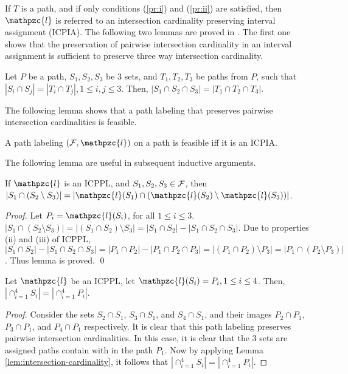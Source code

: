 \documentclass[envcountsect, envcountsame, 11pt]{../lib/llncs2e/llncs}
\def\cF{{\cal F}}
\def\cl{\mathpzc{l}}
\begin{document}
\noindent
If $T$ is a path, and if only conditions (\ref{pr:i}) and (\ref{pr:ii}) are satisfied, then $\cl$ is referred to  an intersection cardinality preserving interval assignment (ICPIA).  
The following two lemmas are proved in \cite{nsnrs09}.  The first one shows that the preservation of pairwise intersection cardinality in an interval assignment is
sufficient to preserve three way intersection cardinality.
\begin{lemma} \label{lem:intersection-cardinality}
Let $P$ be a path, $S_1, S_2, S_3$ be 3 sets, and $T_1, T_2, T_3$ be paths from $P$, such that $|S_i \cap S_j |=|T_i \cap T_j|, 1 \leq i,j \leq 3$. 
Then, $|S_1 \cap S_2 \cap S_3| = |T_1 \cap T_2 \cap T_3|$.  
\end{lemma}
The following lemma shows that  a path labeling that preserves pairwise intersection cardinalities is feasible.  
\begin{lemma} \label{lem:icpia}
  A path labeling $(\cF, \cl)$ on a path is feasible iff it is an
  ICPIA.
\end{lemma}
The following lemma are useful in subsequent inductive arguments. 
\begin{lemma}
  \label{lem:setminuscard}
  If $\cl$ is an ICPPL, and $S_1, S_2, S_3 \in \cF$, then $|S_1 \cap
  (S_2 \setminus S_3)| = |\cl(S_1) \cap (\cl(S_2) \setminus
  \cl(S_3))|$.
\end{lemma}
\begin{proof}%
  Let $P_i = \cl(S_i)$, for all $1 \le i \le  3$.
  $|S_1 \cap (S_2 \setminus S_3)| = |(S_1 \cap S_2) \setminus S_3| =
  |S_1 \cap S_2| - |S_1 \cap S_2 \cap S_3|$. Due to properties (ii)
  and (iii) of ICPPL, $|S_1 \cap S_2| - |S_1 \cap S_2 \cap S_3| = |P_1
  \cap P_2| - |P_1 \cap P_2 \cap P_3| = |(P_1 \cap P_2) \setminus P_3|
  = |P_1 \cap (P_2 \setminus P_3)|$. Thus lemma is proved. \qed
\end{proof}
\begin{lemma}
\label{lem:4-way}
Let $\cl$ be an ICPPL, let $\cl(S_i)=P_i, 1 \leq i \leq 4$.   Then, $\displaystyle |\cap_{i=1}^4 S_i| =| \cap_{i=1}^4 P_i|$.
\end{lemma}
\begin{proof}
Consider the sets $S_2 \cap S_1$, $S_3 \cap S_1$, and $S_4 \cap S_1$, and their  images $P_2 \cap P_1$, $P_3 \cap P_1$, and $P_4 \cap P_1$ respectively.  It is clear that this path labeling preserves pairwise intersection cardinalities.  In this case, it is clear that the  3 sets are assigned paths contain with in the path $P_1$.    Now by applying Lemma \ref{lem:intersection-cardinality}, it follows that $\displaystyle |\cap_{i=1}^4 S_i| =| \cap_{i=1}^4 P_i|$.
\end{proof}
\end{document}

